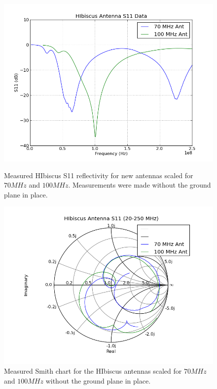 \begin{figure}[htb]
\centering
\begin{minipage}[b]{0.50\textwidth}
\centering
\includegraphics[width=0.95\linewidth]{SCIHI_system/figures/HIbiscus_S11_dB_both.png}
\caption{Measured HIbiscus S11 reflectivity for new antennas scaled for $70 MHz$ and $100 MHz$. Measurements were made without the ground plane in place. }
\label{Fig:HIS11_dB}
\end{minipage}%
\begin{minipage}[b]{0.02\textwidth}
\hspace{1cm}
\end{minipage}%
\begin{minipage}[b]{0.46\textwidth}
\centering
\includegraphics[width=0.95\linewidth]{SCIHI_system/figures/HIbiscus_S11_Smith_both.png}
\caption{Measured Smith chart for the HIbiscus antennas scaled for $70 MHz$ and $100 MHz$ without the ground plane in place.}
\label{Fig:HIS11_Smith}
\end{minipage}
\end{figure}

